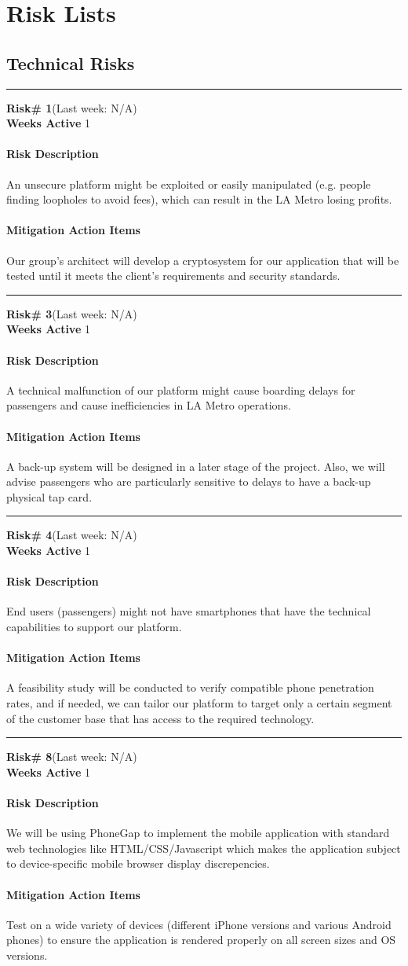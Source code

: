 \newcommand{\risk}[5]{
	\rule{\textwidth}{.1pt}
	\textbf{ Risk\# #1}(Last week: #2)\\
	\textbf{Weeks Active} #3
	\paragraph{Risk Description} #4
	\paragraph{Mitigation Action Items} #5\\
}

\section{Risk Lists}

\subsection{Technical Risks}

\risk{1}{N/A}{1}{
An unsecure platform might be exploited or easily manipulated (e.g. people finding loopholes to avoid fees), which can result in the LA Metro losing profits.
}{
Our group’s architect will develop a cryptosystem for our application that will be tested until it meets the client’s requirements and security standards.
}
\risk{3}{N/A}{1}{
A technical malfunction of our platform might cause boarding delays for passengers and cause inefficiencies in LA Metro operations.
}{
A back-up system will be designed in a later stage of the project. Also, we will advise passengers who are particularly sensitive to delays to have a back-up physical tap card.
}
\risk{4}{N/A}{1}{
End users (passengers) might not have smartphones that have the technical capabilities to support our platform.
}{
A feasibility study will be conducted to verify compatible phone penetration rates, and if needed, we can tailor our platform to target only a certain segment of the customer base that has access to the required technology.
}
\risk{8}{N/A}{1}{
We will be using PhoneGap to implement the mobile application with standard web technologies like HTML/CSS/Javascript which makes the application subject to device-specific mobile browser display discrepencies.
}{
Test on a wide variety of devices (different iPhone versions and various Android phones) to ensure the application is rendered properly on all screen sizes and OS versions.
}

